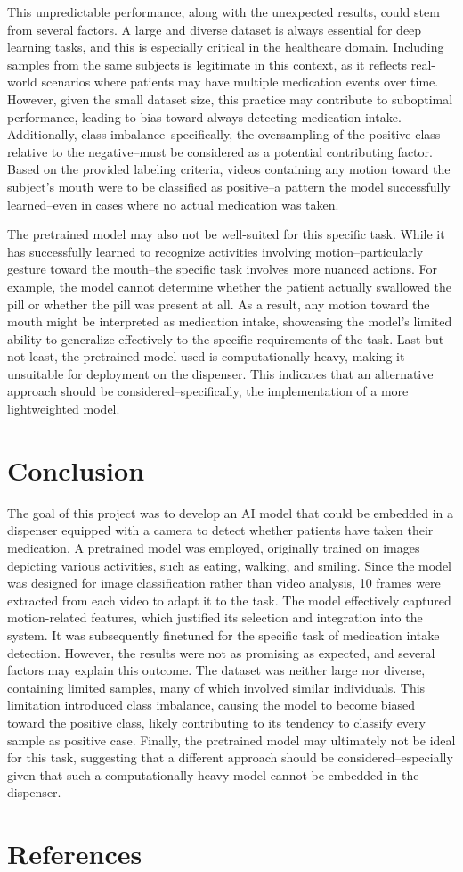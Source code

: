 \documentclass[a4paper,12pt]{article}
\begin{document}
This unpredictable performance, along with the unexpected results, could stem from several factors. A large and diverse
 dataset is always essential for deep learning tasks, and this is especially critical in the healthcare domain. Including 
 samples from the same subjects is legitimate in this context, as it reflects real-world scenarios where patients may have 
 multiple medication events over time. However, given the small dataset size, this practice may contribute to suboptimal 
 performance, leading to bias toward always detecting medication intake. Additionally, class imbalance--specifically, the 
 oversampling of the positive class relative to the negative--must be considered as a potential contributing factor. Based 
 on the provided labeling criteria, videos containing any motion toward the subject's mouth were to be classified as 
 positive--a pattern the model successfully learned--even in cases where no actual medication was taken. 

The pretrained model may also not be well-suited for this specific task. While it has successfully learned to recognize 
activities involving motion--particularly gesture toward the mouth--the specific task involves more nuanced actions. For 
example, the model cannot determine whether the patient actually swallowed the pill or whether the pill was present at all. 
As a result, any motion toward the mouth might be interpreted as medication intake, showcasing the model's limited ability 
to generalize effectively to the specific requirements of the task. Last but not least, the pretrained model used is 
computationally heavy, making it unsuitable for deployment on the dispenser. This indicates that an alternative approach 
should be considered--specifically, the implementation of a more lightweighted model.

\section{Conclusion}
The goal of this project was to develop an AI model that could be embedded in a dispenser equipped with a camera to detect 
whether patients have taken their medication. A pretrained model was employed, originally trained on images depicting 
various activities, such as eating, walking, and smiling. Since the model was designed for image classification rather 
than video analysis, 10 frames were extracted from each video to adapt it to the task. The model effectively captured 
motion-related features, which justified its selection and integration into the system. It was subsequently finetuned 
for the specific task of medication intake detection. However, the results were not as promising as expected, and several 
factors may explain this outcome. The dataset was neither large nor diverse, containing limited samples, many of which 
involved similar individuals. This limitation introduced class imbalance, causing the model to become biased toward the 
positive class, likely contributing to its tendency to classify every sample as positive case. Finally, the pretrained 
model may ultimately not be ideal for this task, suggesting that a different approach should be considered--especially 
given that such a computationally heavy model cannot be embedded in the dispenser.

\section*{References}
\end{document}
